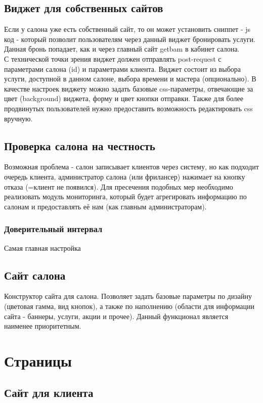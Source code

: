 \documentclass[DIV=calc, paper=a4, fontsize=11pt]{scrartcl} %
\begin{document}
\subsection{Виджет для собственных сайтов} \label{subsection:widget}
Если у салона уже есть собственный сайт, то он может установить сниппет - js код - который позволит пользователям через данный виджет бронировать услуги. Данная бронь попадает, как и через главный сайт getbam в кабинет салона.
\\[0.5cm]
С технической точки зрения виджет должен отправлять post-request с параметрами салона (id) и параметрами клиента. 
Виджет состоит из выбора услуги, доступной в данном салоне, выбора времени и мастера (опционально).
В качестве настроек виджету можно задать базовые css-параметры, отвечающие за цвет (background) виджета, форму и цвет кнопки отправки. Также для более продвинутых пользователей нужно предоставить возможность редактировать css вручную.

\subsection{Проверка салона на честность}
Возможная проблема - салон записывает клиентов через систему, но как подходит очередь клиента, администратор салона (или фрилансер) нажимает на кнопку отказа (=клиент не появился). Для пресечения подобных мер необходимо реализовать модуль мониторинга, который будет агрегировать информацию по салонам и предоставлять её нам (как главным администраторам).

\subsubsection{Доверительный интервал}
Самая главная настройка 

\subsection{Сайт салона}
Конструктор сайта для салона. Позволяет задать базовые параметры по дизайну (цветовая гамма, вид кнопок), а также по наполнению (области для информации сайта - баннеры, услуги, акции и прочее). Данный функционал является наименее приоритетным.

\section{Страницы}

\subsection{Сайт для клиента}
\end{document}
